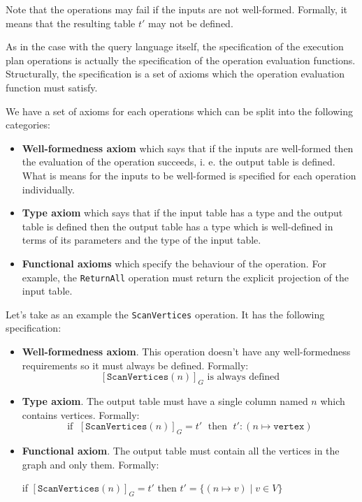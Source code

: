 \documentclass[14pt]{constructor-thesis}
\theoremstyle{definition}
\begin{document}
Note that the operations may fail if the inputs are not well-formed. Formally, it means that the resulting table $t'$ may not be defined.

As in the case with the query language itself, the specification of the execution plan operations is actually the specification of the operation evaluation functions. Structurally, the specification is a set of axioms which the operation evaluation function must satisfy.

We have a set of axioms for each operations which can be split into the following categories:
\begin{itemize}
  \item \textbf{Well-formedness axiom} which says that if the inputs are well-formed then the evaluation of the operation succeeds, i. e. the output table is defined. What is means for the inputs to be well-formed is specified for each operation individually.
  \item \textbf{Type axiom} which says that if the input table has a type and the output table is defined then the output table has a type which is well-defined in terms of its parameters and the type of the input table.
  \item \textbf{Functional axioms} which specify the behaviour of the operation. For example, the \texttt{ReturnAll} operation must return the explicit projection of the input table.

\end{itemize}

Let's take as an example the \texttt{ScanVertices} operation. It has the following specification:
\begin{itemize}
  \item \textbf{Well-formedness axiom}. This operation doesn't have any well-formedness requirements so it must always be defined. Formally:
  $$ [\texttt{ScanVertices}(n)]_G \text{ is always defined} $$
  \item \textbf{Type axiom}. The output table must have a single column named $n$ which contains vertices. Formally:
  $$ \text{if } \; [\texttt{ScanVertices}(n)]_G = t' \; \text{ then } \; t' : (n \mapsto \texttt{vertex}) $$
  \item \textbf{Functional axiom}. The output table must contain all the vertices in the graph and only them. Formally:
  \begin{center}
    if $[\texttt{ScanVertices}(n)]_G = t'$ then $t' = \{(n \mapsto v) \mid v \in V\}$
  \end{center}
\end{itemize}
\end{document}
